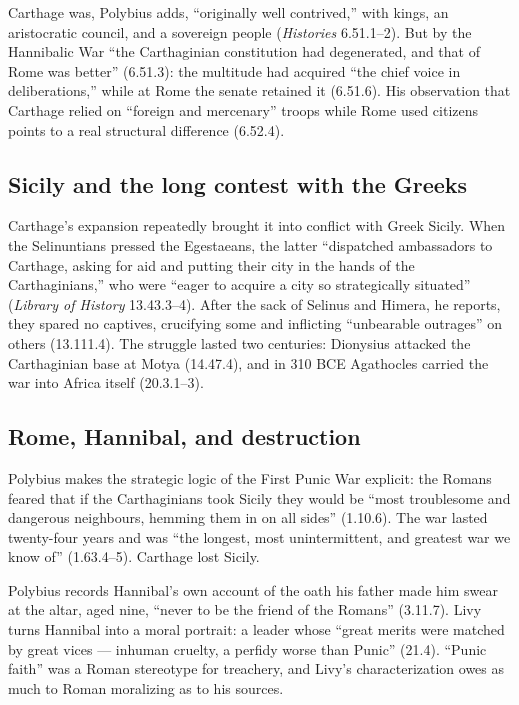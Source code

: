 \documentclass[12pt]{article}
\begin{document}
Carthage was, Polybius adds, ``originally well contrived,'' with kings,
an aristocratic council, and a sovereign people (\emph{Histories}
6.51.1--2). But by the Hannibalic War ``the Carthaginian constitution
had degenerated, and that of Rome was better'' (6.51.3): the multitude
had acquired ``the chief voice in deliberations,'' while at Rome the
senate retained it (6.51.6). His observation that Carthage relied on
``foreign and mercenary'' troops while Rome used citizens points to a
real structural difference (6.52.4).

\subsection{Sicily and the long contest with the Greeks}

Carthage's expansion repeatedly brought it into conflict with Greek
Sicily. When the Selinuntians pressed the Egestaeans, the latter
``dispatched ambassadors to Carthage, asking for aid and putting their
city in the hands of the Carthaginians,'' who were ``eager to acquire a
city so strategically situated'' (\emph{Library of History} 13.43.3--4).
After the sack of Selinus and Himera, he reports, they spared no
captives, crucifying some and inflicting ``unbearable outrages'' on
others (13.111.4). The struggle lasted two centuries: Dionysius attacked
the Carthaginian base at Motya (14.47.4), and in 310 BCE Agathocles
carried the war into Africa itself (20.3.1--3).

\subsection{Rome, Hannibal, and destruction}

Polybius makes the strategic logic of the First Punic War explicit: the
Romans feared that if the Carthaginians took Sicily they would be ``most
troublesome and dangerous neighbours, hemming them in on all sides''
(1.10.6). The war lasted twenty-four years and was ``the longest, most
unintermittent, and greatest war we know of'' (1.63.4--5). Carthage lost
Sicily.

Polybius records Hannibal's own account of the oath his father made him
swear at the altar, aged nine, ``never to be the friend of the Romans''
(3.11.7). Livy turns Hannibal into a moral portrait: a leader whose
``great merits were matched by great vices --- inhuman cruelty, a
perfidy worse than Punic'' (21.4). ``Punic faith'' was a Roman
stereotype for treachery, and Livy's characterization owes as much to
Roman moralizing as to his sources.
\end{document}
